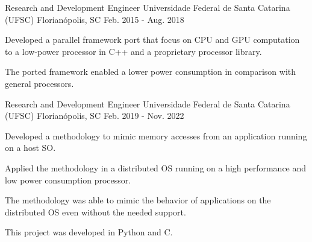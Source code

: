 

\begin{cventries}


  \cventry
    {Research and Development Engineer} %
    {Universidade Federal de Santa Catarina (UFSC)} %
    {Florianópolis, SC} %
    {Feb. 2015 - Aug. 2018} %
    {
      \begin{cvitems} %
        \item {Developed a parallel framework port that focus on CPU and GPU
                computation to a low-power processor in C++ and a proprietary
            processor library.}
        \item {The ported framework enabled a lower power consumption in
          comparison with general processors.}
      \end{cvitems}
    }


    \cventry
    {Research and Development Engineer} %
    {Universidade Federal de Santa Catarina (UFSC)} %
    {Florianópolis, SC} %
    {Feb. 2019 - Nov. 2022} %
    {
        \begin{cvitems} %
        \item{Developed a methodology to mimic memory accesses from an
            application running on a host SO.}
        \item{Applied the methodology in a distributed OS running on a
            high performance and low power consumption processor.}
        \item{The methodology was able to mimic the behavior of applications
            on the distributed OS even without the needed support.}
        \item{This project was developed in Python and C.}
        \end{cvitems}
    }



\end{cventries}
